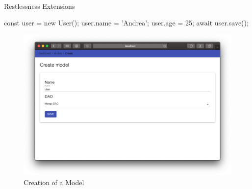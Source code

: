 \begin{chapter}{Restlessness Extensions}
    \bigskip
    \begin{code}[caption=User model usage, label={lst:user_model_usage}]
const user = new User();
user.name = 'Andrea';
user.age = 25;
await user.save();
    \end{code}

    \begin{figure}
        \centering
        \includegraphics[width=\linewidth]{source/images/rln-wi-create-model.png}
        \caption{Creation of a Model}
        \label{fig:wi_dao_mongo_model}
    \end{figure}

\end{chapter}